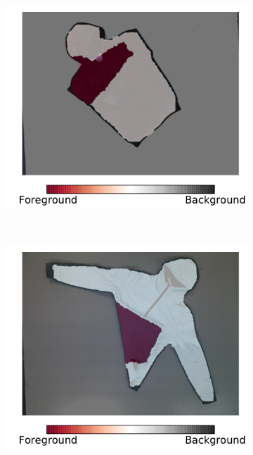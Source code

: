 \begin{figure}[htbp]
	\centering
    \begin{subfigure}[l]{0.49\textwidth}
	    \centering
    	\includegraphics[width=\textwidth]
    	{figures/clustering/hoodie13-clustering.pdf}
	\end{subfigure}
	~
    \begin{subfigure}[r]{0.49\textwidth}
	    \centering
    	\includegraphics[width=\textwidth]
    	{figures/clustering/jacket7-clustering.pdf}
	\end{subfigure} 

\end{figure}
